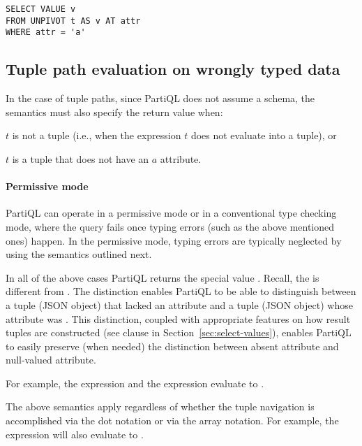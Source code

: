 \begin{lstlisting}
SELECT VALUE v
FROM UNPIVOT t AS v AT attr
WHERE attr = 'a'
\end{lstlisting}
 
\subsection{Tuple path evaluation on wrongly typed data}
\label{sec:tuple-path-on-wrong}

In the case of tuple paths, since PartiQL does not assume a schema, the
semantics must also specify the return value when:

\begin{compact_enum}
\item $t$ is not a tuple (i.e., when the expression $t$ does not evaluate into a
tuple), or

\item $t$ is a tuple that does not have an $a$ attribute.
\end{compact_enum}

\paragraph{Permissive mode} PartiQL can operate in a permissive mode or
in a conventional type checking mode, where the query fails once typing errors
(such as the above mentioned ones) happen. In the permissive mode, typing errors
are typically neglected by using the semantics outlined next.

In all of the above cases PartiQL returns the special value .
Recall, the  is different from . The distinction enables
PartiQL to be able to distinguish between a tuple (JSON object) that lacked an
attribute  and a tuple (JSON object) whose  attribute was .
This distinction, coupled with appropriate features on how result tuples are
constructed (see  clause in Section~\ref{sec:select-values}), enables
PartiQL to easily preserve (when needed) the distinction between absent
attribute and null-valued attribute.

For example, the expression  and the expression  evaluate to .

The above semantics apply regardless of whether the tuple navigation is
accomplished via the dot notation or via the array notation. For example, the
expression  will also evaluate to
.

